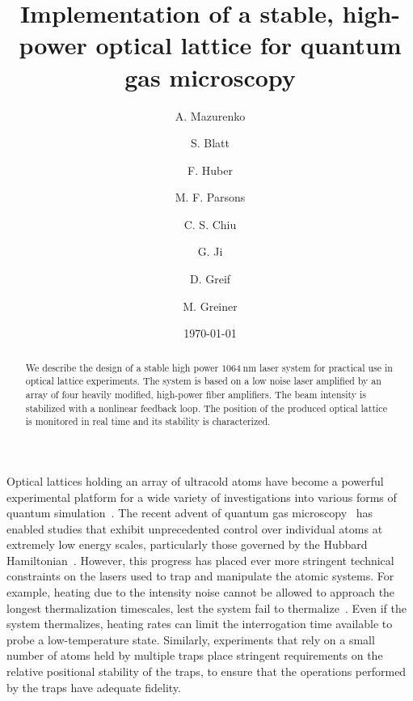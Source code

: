 \documentclass[twocolumn,aps,pra,showpacs,preprintnumbers,bibnotes]{revtex4-1}
\newcommand\unit[2]{\ensuremath{#1~\mathrm{{#2}}}}
\begin{document}
\title{Implementation of a stable, high-power optical lattice for quantum gas microscopy}

\author{A. Mazurenko}
\author{S. Blatt}
\author{F. Huber}
\author{M. F. Parsons}
\author{C. S. Chiu}
\author{G. Ji}
\author{D. Greif}
\author{M. Greiner}

\date{\today}
\begin{abstract}
 We describe the design of a stable high power \unit{1064}{nm} laser system for practical use in optical lattice experiments. The system is based on a low noise laser amplified by an array of four heavily modified, high-power fiber amplifiers. The beam intensity is stabilized with a nonlinear feedback loop. The position of the produced optical lattice is monitored in real time and its stability is characterized.
\end{abstract}
\maketitle

Optical lattices holding an array of ultracold atoms have become a powerful experimental platform for a wide variety of investigations into various forms of quantum simulation~\cite{Friedenauer2008, Kim2010, Struck2011, Simon2011, Yan2013, Drewes2016, Murmann2015}.
The recent advent of quantum gas microscopy~\cite{Bakr2009, Sherson2010, Haller2015, Cheuk2015, Parsons2015, Edge2015, Omran2015, Greif2016, Cheuk2016, Parsons2016, Boll2016, Cheuk2016a, Brown2017} has enabled studies that exhibit unprecedented control over individual atoms at extremely low energy scales, particularly those governed by the Hubbard Hamiltonian~\cite{Hubbard1963}.
However, this progress has placed ever more stringent technical constraints on the lasers used to trap and manipulate the atomic systems.
For example, heating due to the intensity noise cannot be allowed to approach the longest thermalization timescales, lest the system fail to thermalize~\cite{Savard1997}.
Even if the system thermalizes, heating rates can limit the interrogation time available to probe a low-temperature state.
Similarly, experiments that rely on a small number of atoms held by multiple traps place stringent requirements on the relative positional stability of the traps, to ensure that the operations performed by the traps have adequate fidelity.
\end{document}
